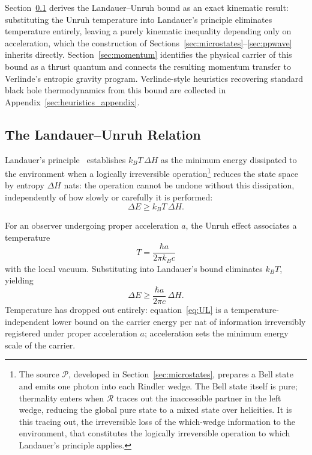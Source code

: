 \documentclass[12pt,a4paper]{article}
\begin{document}
Section~\ref{sec:UL} derives the Landauer--Unruh bound 
as an exact kinematic result: substituting the Unruh 
temperature into Landauer's principle eliminates 
temperature entirely, leaving a purely kinematic 
inequality depending only on acceleration, which the 
construction of Sections~\ref{sec:microstates}--\ref{sec:ppwave} 
inherits directly. Section~\ref{sec:momentum} identifies 
the physical carrier of this bound as a thrust quantum 
and connects the resulting momentum transfer to 
Verlinde's entropic gravity program. Verlinde-style 
heuristics recovering standard black hole thermodynamics 
from this bound are collected in 
Appendix~\ref{sec:heuristics_appendix}.

\subsection{The Landauer--Unruh Relation}
\label{sec:UL}

Landauer's principle~\cite{landauer1961irreversibility} 
establishes $k_BT\,\Delta H$ as the minimum energy dissipated 
to the environment when a logically irreversible operation\footnote{
  The source $\mathcal{P}$, developed in 
  Section~\ref{sec:microstates}, prepares a Bell state 
  and emits one photon into each Rindler wedge. The Bell 
  state itself is pure; thermality enters when $\mathcal{R}$ 
  traces out the inaccessible partner in the left wedge, 
  reducing the global pure state to a mixed state over 
  helicities. It is this tracing out, the irreversible 
  loss of the which-wedge information to the environment, 
  that constitutes the logically irreversible operation 
  to which Landauer's principle applies.}
reduces the state space by entropy $\Delta H$ nats: the 
operation cannot be undone without this dissipation, 
independently of how slowly or carefully it is performed:
%
\begin{equation}
  \Delta E \geq k_B T \, \Delta H.
\end{equation}


For an observer undergoing proper acceleration $a$, the Unruh effect associates a temperature
\begin{equation}
T = \frac{\hbar a}{2 \pi k_B c}
\end{equation}
with the local vacuum. Substituting into Landauer's bound eliminates $k_B T$, yielding
\begin{equation}
\boxed{\Delta E \geq \frac{\hbar a}{2\pi c} \, \Delta H.}
\label{eq:UL}
\end{equation}
Temperature has dropped out entirely:
equation~\eqref{eq:UL} is a temperature-independent lower bound 
on the carrier energy per nat of information irreversibly 
registered under proper acceleration $a$;
acceleration sets the minimum energy scale of the carrier.
\end{document}
